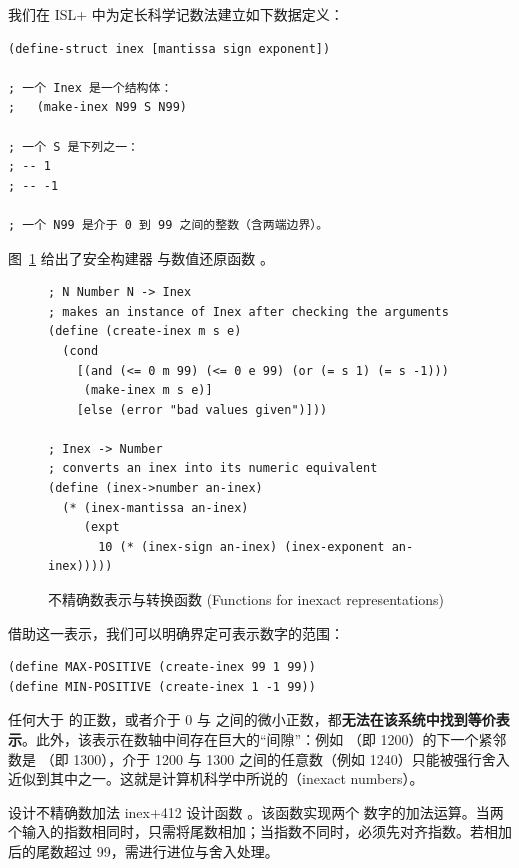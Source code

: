 我们在 ISL+ 中为定长科学记数法建立如下数据定义：

\begin{lstlisting}[language=BSL]
(define-struct inex [mantissa sign exponent])

; 一个 Inex 是一个结构体：
;   (make-inex N99 S N99)

; 一个 S 是下列之一：
; -- 1
; -- -1

; 一个 N99 是介于 0 到 99 之间的整数（含两端边界）。
\end{lstlisting}

图~\ref{fig:143} 给出了安全构建器  与数值还原函数 。

\begin{figure}[htbp]
  \centering
\begin{lstlisting}[language=BSL, basicstyle=\scriptsize\ttfamily]
; N Number N -> Inex
; makes an instance of Inex after checking the arguments
(define (create-inex m s e)
  (cond
    [(and (<= 0 m 99) (<= 0 e 99) (or (= s 1) (= s -1)))
     (make-inex m s e)]
    [else (error "bad values given")]))

; Inex -> Number
; converts an inex into its numeric equivalent
(define (inex->number an-inex)
  (* (inex-mantissa an-inex)
     (expt
       10 (* (inex-sign an-inex) (inex-exponent an-inex)))))
\end{lstlisting}
  \caption{不精确数表示与转换函数 (Functions for inexact representations)}
  \label{fig:143}
\end{figure}

借助这一表示，我们可以明确界定可表示数字的范围：
\begin{lstlisting}[language=BSL]
(define MAX-POSITIVE (create-inex 99 1 99))
(define MIN-POSITIVE (create-inex 1 -1 99))
\end{lstlisting}

任何大于  的正数，或者介于 0 与  之间的微小正数，都\textbf{无法在该系统中找到等价表示}。此外，该表示在数轴中间存在巨大的“间隙”：例如 （即 1200）的下一个紧邻数是 （即 1300），介于 1200 与 1300 之间的任意数（例如 1240）只能被强行舍入近似到其中之一。这就是计算机科学中所说的（inexact numbers）。

\begin{exercise}{设计不精确数加法 inex+}{412}
设计函数 。该函数实现两个  数字的加法运算。当两个输入的指数相同时，只需将尾数相加；当指数不同时，必须先对齐指数。若相加后的尾数超过 99，需进行进位与舍入处理。
\end{exercise}

